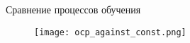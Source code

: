 
\begin{frame}{Сравнение процессов обучения}
\begin{figure}
\centering
\texttt{[image: ocp\_against\_const.png]}
\end{figure}
\end{frame}